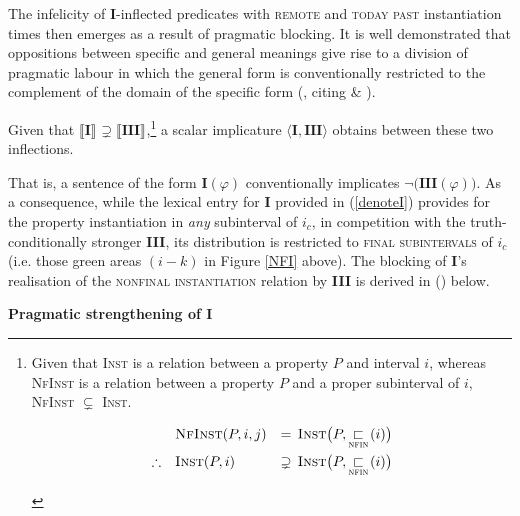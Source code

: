 \documentclass[11pt,dvipsnames]{report}
\providecommand{\denote}[2][]{\ensuremath{\llbracket{#2}\rrbracket^{#1}}}
\begin{document}
The infelicity of \textbf{I}-inflected predicates with \textsc{remote} and \textsc{today past} instantiation times then emerges as a result of pragmatic blocking. It is well demonstrated that oppositions between specific and general meanings give rise to a division of pragmatic labour in which the general form is conventionally restricted to the complement of the domain of the specific form (\citealp{Deo2015}, citing \citealp{Horn1984} \& \citealp{Horn2012a}).


 Given that $ \denote{\textbf{I}} \supsetneq \denote{\textbf{III}}$,\footnote{
 	Given that \textsc{Inst} is a relation between a property $ P $ and interval $ i $, whereas \textsc{NfInst} is a relation between a property $ P $ and a proper subinterval of $ i $, \textsc{NfInst} $ \subsetneq $ \textsc{Inst}.
 	\begin{fleqn}
 		\begin{equation*}
 		\begin{split}
 		& \textsc{NfInst}(P,i,j) & =\,  \textsc{Inst}\big(P,\underset{\textsc{nfin}}{\sqsubset}\!(i)\big)\\
 		\therefore\quad &\textsc{Inst}(P,i)&\supsetneq\, \textsc{Inst}\big(P,\underset{\textsc{nfin}}{\sqsubset}\!(i)\big)
 		\end{split} \end{equation*} \end{fleqn}
 }
 a scalar implicature $ \langle \textbf{I},\textbf{III}\rangle$ obtains between these two inflections.
 


That is, a sentence of the form \textbf{I}$ (\varphi) $ conventionally implicates $ \neg\big(\textbf{III}(\varphi)\big) $. As a consequence, while the lexical entry for \textbf{I} provided in (\ref{denoteI}) provides for the property instantiation in \textit{any} subinterval of $ i_c $, in competition with the truth-conditionally stronger \textbf{III}, its distribution is restricted to \textsc{final subintervals} of $ i_c $ (i.e. those green areas $ (i-k) $ in Figure \ref{NFI} above). The blocking of \textbf{I}'s realisation of the \textsc{nonfinal instantiation} relation by \textbf{III} is derived in (\nextx) below.

\pex\textbf{Pragmatic strengthening of I}

\end{document}
